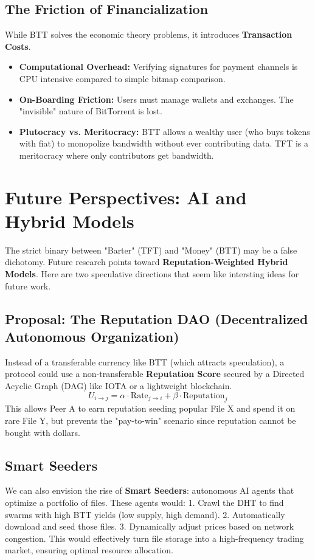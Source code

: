 \documentclass[12pt]{article}
\begin{document}
\subsection{The Friction of Financialization}
While BTT solves the economic theory problems, it introduces \textbf{Transaction Costs}.
\begin{itemize}
    \item \textbf{Computational Overhead:} Verifying signatures for payment channels is CPU intensive compared to simple bitmap comparison.
    \item \textbf{On-Boarding Friction:} Users must manage wallets and exchanges. The "invisible" nature of BitTorrent is lost.
    \item \textbf{Plutocracy vs. Meritocracy:} BTT allows a wealthy user (who buys tokens with fiat) to monopolize bandwidth without ever contributing data. TFT is a meritocracy where only contributors get bandwidth.
\end{itemize}

\section{Future Perspectives: AI and Hybrid Models}

The strict binary between "Barter" (TFT) and "Money" (BTT) may be a false dichotomy. Future research points toward \textbf{Reputation-Weighted Hybrid Models}. Here are two speculative directions that seem like intersting ideas for future work.

\subsection{Proposal: The Reputation DAO (Decentralized Autonomous Organization)}
Instead of a transferable currency like BTT (which attracts speculation), a protocol could use a non-transferable \textbf{Reputation Score} secured by a Directed Acyclic Graph (DAG) like IOTA or a lightweight blockchain.
\begin{equation}
U_{i \to j} = \alpha \cdot \text{Rate}_{j \to i} + \beta \cdot \text{Reputation}_j
\end{equation}
This allows Peer A to earn reputation seeding popular File X and spend it on rare File Y, but prevents the "pay-to-win" scenario since reputation cannot be bought with dollars.

\subsection{Smart Seeders}
We can also envision the rise of \textbf{Smart Seeders}: autonomous AI agents that optimize a portfolio of files. These agents would:
1. Crawl the DHT to find swarms with high BTT yields (low supply, high demand).
2. Automatically download and seed those files.
3. Dynamically adjust prices based on network congestion.
This would effectively turn file storage into a high-frequency trading market, ensuring optimal resource allocation.
\end{document}
